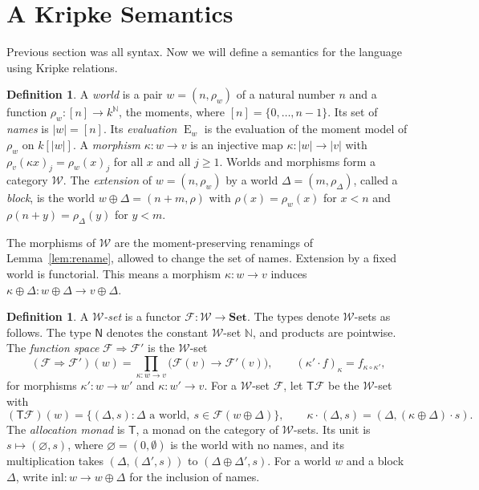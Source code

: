 \documentclass[11pt,a4paper]{report}
\theoremstyle{plain}
\theoremstyle{definition}
\newtheorem{definition}[theorem]{Definition}
\theoremstyle{remark}
\newcommand{\E}{\operatorname{E}}
\newcommand{\NN}{\mathbb{N}}
\newcommand{\T}{\mathsf{T}}
\newcommand{\Nat}{\mathsf{N}}
\newcommand{\W}{\mathcal{W}}
\begin{document}
\section{A Kripke Semantics}
\label{sec:worlds}

Previous section was all syntax. Now we will define a semantics for the language
using Kripke relations.

\begin{definition}
\label{def:world}
A \emph{world} is a pair $w = (n, \rho_w)$ of a natural number $n$ and a
function $\rho_w : [n] \to k^{\NN}$, the moments, where
$[n] = \{0, \dots, n - 1\}$. Its set of \emph{names} is $|w| = [n]$. Its
\emph{evaluation} $\E_w$ is the evaluation of the moment model of $\rho_w$ on
$k[|w|]$. A \emph{morphism} $\kappa : w \to v$ is an injective map
$\kappa : |w| \to |v|$ with $\rho_v(\kappa x)_j = \rho_w(x)_j$ for all $x$ and
all $j \geq 1$. Worlds and morphisms form a category $\W$. The \emph{extension}
of $w = (n, \rho_w)$ by a world $\Delta = (m, \rho_\Delta)$, called a
\emph{block}, is the world $w \oplus \Delta = (n + m, \rho)$ with
$\rho(x) = \rho_w(x)$ for $x < n$ and $\rho(n + y) = \rho_\Delta(y)$ for $y < m$.
\end{definition}

The morphisms of $\W$ are the moment-preserving renamings of
Lemma~\ref{lem:rename}, allowed to change the set of names. Extension by a fixed 
world is functorial. This means a morphism $\kappa : w \to v$ induces
$\kappa \oplus \Delta : w \oplus \Delta \to v \oplus \Delta$.

\begin{definition}
\label{def:kripke-semantics}
A \emph{$\W$-set} is a functor $\mathcal{F} : \W \to \mathbf{Set}$. The types
denote $\W$-sets as follows. The type $\Nat$ denotes the constant $\W$-set
$\NN$, and products are pointwise. The \emph{function
space} $\mathcal{F} \Rightarrow \mathcal{F}'$ is the $\W$-set
\[
  (\mathcal{F} \Rightarrow \mathcal{F}')(w)
    = \prod_{\kappa : w \to v} \bigl(\mathcal{F}(v) \to \mathcal{F}'(v)\bigr),
  \qquad (\kappa' \cdot f)_{\kappa} = f_{\kappa \circ \kappa'} ,
\]
for morphisms $\kappa' : w \to w'$ and $\kappa : w' \to v$. For a $\W$-set
$\mathcal{F}$, let $\T\mathcal{F}$ be the $\W$-set with
\[
  (\T\mathcal{F})(w) = \{(\Delta, s) : \Delta \text{ a world},\
    s \in \mathcal{F}(w \oplus \Delta)\},
  \qquad \kappa \cdot (\Delta, s) = (\Delta, (\kappa \oplus \Delta) \cdot s) .
\]
The \emph{allocation monad} is $\T$, a monad on the category of $\W$-sets. Its
unit is $s \mapsto (\varnothing, s)$, where $\varnothing = (0, \emptyset)$ is the
world with no names, and its multiplication takes $(\Delta, (\Delta', s))$ to
$(\Delta \oplus \Delta', s)$. For a world $w$ and a block $\Delta$, write
$\mathrm{inl} : w \to w \oplus \Delta$ for the inclusion of names.
\end{definition}
\end{document}
